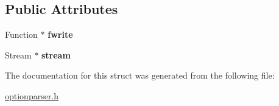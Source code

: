 \subsection*{Public Attributes}
\begin{DoxyCompactItemize}
\item 
\mbox{\label{structoption_1_1PrintUsageImplementation_1_1StreamWriter_a6f54abc9a3f7f00206d87a3619713954}} 
Function $\ast$ {\bfseries fwrite}
\item 
\mbox{\label{structoption_1_1PrintUsageImplementation_1_1StreamWriter_ab4bfd31b1c37376505ccd4230f7f7ad9}} 
Stream $\ast$ {\bfseries stream}
\end{DoxyCompactItemize}


The documentation for this struct was generated from the following file\+:\begin{DoxyCompactItemize}
\item 
\hyperlink{optionparser_8h}{optionparser.\+h}\end{DoxyCompactItemize}
